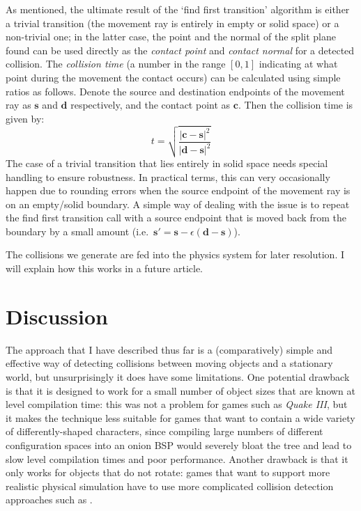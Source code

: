 \documentclass[10pt,twocolumn]{article}
\begin{document}
As mentioned, the ultimate result of the `find first transition' algorithm is either a trivial transition (the movement ray is entirely in empty or solid space) or a non-trivial one; in the latter case, the point and the normal of the split plane found can be used directly as the \emph{contact point} and \emph{contact normal} for a detected collision. The \emph{collision time} (a number in the range $[0,1]$ indicating at what point during the movement the contact occurs) can be calculated using simple ratios as follows. Denote the source and destination endpoints of the movement ray as $\mathbf{s}$ and $\mathbf{d}$ respectively, and the contact point as $\mathbf{c}$. Then the collision time is given by:
%
\[
t = \sqrt{\frac{|\mathbf{c} - \mathbf{s}|^2}{|\mathbf{d} - \mathbf{s}|^2}}
\]
%
The case of a trivial transition that lies entirely in solid space needs special handling to ensure robustness. In practical terms, this can very occasionally happen due to rounding errors when the source endpoint of the movement ray is on an empty/solid boundary. A simple way of dealing with the issue is to repeat the find first transition call with a source endpoint that is moved back from the boundary by a small amount (i.e.~$\mathbf{s'} = \mathbf{s} - \epsilon(\mathbf{d} - \mathbf{s})$).

The collisions we generate are fed into the physics system for later resolution. I will explain how this works in a future article.

\section{Discussion}
\label{sec:discussion}

The approach that I have described thus far is a (comparatively) simple and effective way of detecting collisions between moving objects and a stationary world, but unsurprisingly it does have some limitations. One potential drawback is that it is designed to work for a small number of object sizes that are known at level compilation time: this was not a problem for games such as \emph{Quake III}, but it makes the technique less suitable for games that want to contain a wide variety of differently-shaped characters, since compiling large numbers of different configuration spaces into an onion BSP would severely bloat the tree and lead to slow level compilation times and poor performance. Another drawback is that it only works for objects that do not rotate: games that want to support more realistic physical simulation have to use more complicated collision detection approaches such as \cite{?}.
\end{document}
